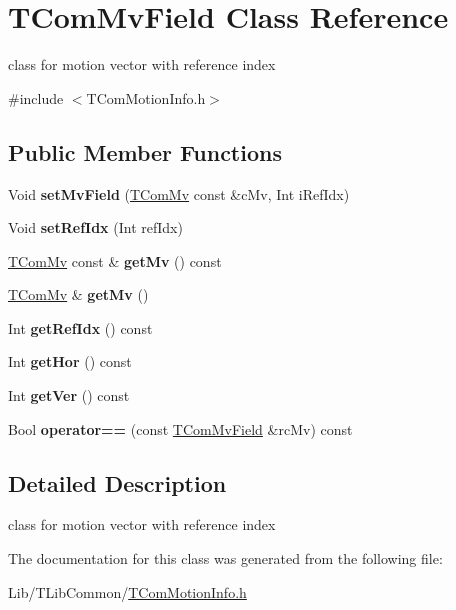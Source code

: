 \hypertarget{class_t_com_mv_field}{}\section{T\+Com\+Mv\+Field Class Reference}
\label{class_t_com_mv_field}


class for motion vector with reference index  




{\ttfamily \#include $<$T\+Com\+Motion\+Info.\+h$>$}

\subsection*{Public Member Functions}
\begin{DoxyCompactItemize}
\item 
\mbox{\label{class_t_com_mv_field_af0b0094159f92f01d444323876ec1566}} 
Void {\bfseries set\+Mv\+Field} (\hyperlink{class_t_com_mv}{T\+Com\+Mv} const \&c\+Mv, Int i\+Ref\+Idx)
\item 
\mbox{\label{class_t_com_mv_field_a9cec78ca59c6e2a7969e16c27cf05745}} 
Void {\bfseries set\+Ref\+Idx} (Int ref\+Idx)
\item 
\mbox{\label{class_t_com_mv_field_aaeaaca41c9a2ee28a111e935a5b87e3b}} 
\hyperlink{class_t_com_mv}{T\+Com\+Mv} const  \& {\bfseries get\+Mv} () const
\item 
\mbox{\label{class_t_com_mv_field_a8fcfedc6a12d8f35d3eff692525b3dba}} 
\hyperlink{class_t_com_mv}{T\+Com\+Mv} \& {\bfseries get\+Mv} ()
\item 
\mbox{\label{class_t_com_mv_field_a821ab7623acbff113ffd0a8990230fcb}} 
Int {\bfseries get\+Ref\+Idx} () const
\item 
\mbox{\label{class_t_com_mv_field_ac1aedaa220069ea6820f45e4b414f693}} 
Int {\bfseries get\+Hor} () const
\item 
\mbox{\label{class_t_com_mv_field_a165a5a59292549cf8a68bda3575559bf}} 
Int {\bfseries get\+Ver} () const
\item 
\mbox{\label{class_t_com_mv_field_a59948d07d2d4f379798137db3e98a8e1}} 
Bool {\bfseries operator==} (const \hyperlink{class_t_com_mv_field}{T\+Com\+Mv\+Field} \&rc\+Mv) const
\end{DoxyCompactItemize}


\subsection{Detailed Description}
class for motion vector with reference index 

The documentation for this class was generated from the following file\+:\begin{DoxyCompactItemize}
\item 
Lib/\+T\+Lib\+Common/\hyperlink{_t_com_motion_info_8h}{T\+Com\+Motion\+Info.\+h}\end{DoxyCompactItemize}
